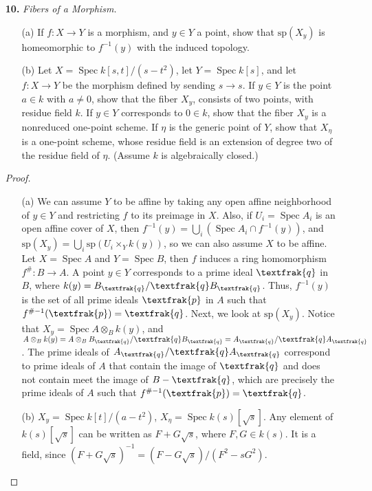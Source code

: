 \documentclass{article}
\newcommand{\goth}[1]{\textfrak{#1}}
\DeclareMathOperator{\spec}{Spec}
\begin{document}
\begin{enumerate} [label=\textbf{\arabic*.}, leftmargin=0em]
\item[\textbf{10.}] \textit{Fibers of a Morphism.}
\begin{itemize} [leftmargin=0cm]
    \item[(a)] If $f : X \to Y$ is a morphism, and $y \in Y$ a point, show that $\text{sp}(X_y)$ is homeomorphic to $f^{-1}(y)$ with the induced topology.
    \item[(b)] Let $X = \spec{k[s, t] / (s - t^2)}$, let $Y = \spec{k[s]}$, and let $f : X \to Y$ be the morphism defined by sending $s \to s$. If $y \in Y$ is the point $a \in k$ with $a \neq 0$, show that the fiber $X_y$, consists of two points, with residue field $k$. If $y \in Y$ corresponds to $0 \in k$, show that the fiber $X_y$ is a nonreduced one-point scheme. If $\eta$ is the generic point of $Y$, show that $X_\eta$ is a one-point scheme, whose residue field is an extension of degree two of the residue field of $\eta$. (Assume $k$ is algebraically closed.)
\end{itemize}

\begin{proof} $ $ \vspace{0pt}
    \begin{itemize} [leftmargin=0cm]
        \item[(a)] We can assume $Y$ to be affine by taking any open affine neighborhood of $y \in Y$ and restricting $f$ to its preimage in $X$. Also, if $U_i = \spec{A_i}$ is an open affine cover of $X$, then $f^{-1}(y) = \bigcup_i (\spec{A_i} \cap f^{-1}(y))$, and $\text{sp}(X_y) = \bigcup_i \text{sp}(U_i \times_Y k(y))$, so we can also assume  $X$ to be affine. Let $X = \spec{A}$ and $Y = \spec{B}$, then $f$ induces a ring homomorphism $f^\# : B \to A$. A point $y \in Y$ corresponds to a prime ideal $\goth{q}$ in $B$, where $k(y) = B_\goth{q} / \goth{q} B_\goth{q}$. Thus, $f^{-1}(y)$ is the set of all prime ideals $\goth{p}$ in $A$ such that $f^{\#-1}(\goth{p}) = \goth{q}$. Next, we look at $\text{sp}(X_y)$. Notice that $X_y = \spec{A \otimes_B k(y)}$, and $A \otimes_B k(y) = A \otimes_B B_\goth{q} / \goth{q} B_\goth{q} = A_\goth{q} / \goth{q} A_\goth{q}$. The prime ideals of $A_\goth{q} / \goth{q} A_\goth{q}$ correspond to prime ideals of $A$ that contain the image of $\goth{q}$ and does not contain meet the image of $B - \goth{q}$, which are precisely the prime ideals of $A$ such that $f^{\#-1}(\goth{p}) = \goth{q}$.

        \item[(b)] $X_y = \spec{k[t] / (a - t^2)}$, $X_\eta = \spec{k(s)[\sqrt{s}]}$. Any element of $k(s)[\sqrt{s}]$ can be written as $F + G\sqrt{s}$, where $F, G \in k(s)$. It is a field, since $(F + G\sqrt{s})^{-1} = (F - G\sqrt{s}) / (F^2 - sG^2)$.
    \end{itemize}
\end{proof}


\end{enumerate}
\end{document}
